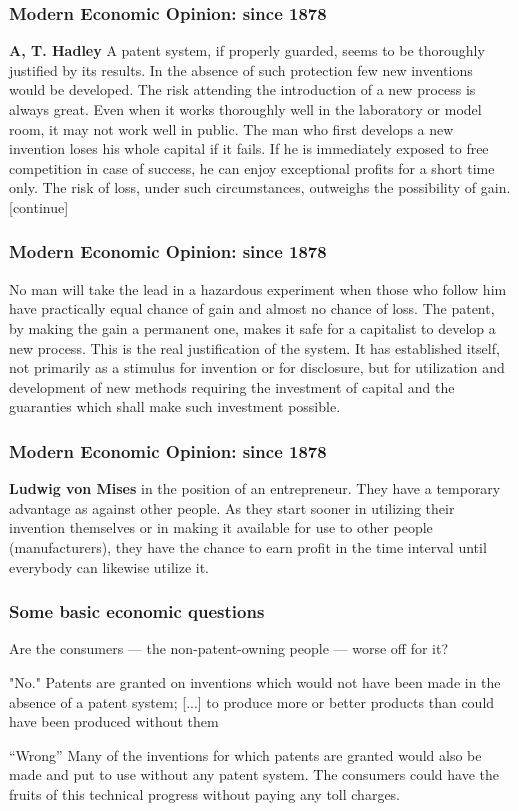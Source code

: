 \begin{frame}
\frametitle{Modern Economic Opinion: since 1878}
\textbf{A, T. Hadley}
A patent system, if properly guarded, seems to be thoroughly justified by its results. In the absence of such protection few new inventions would be developed. The risk attending the introduction of a new process is always great. Even when it works thoroughly well in the laboratory or model room, it may not work well in public. The man who first develops a new invention loses his whole capital if it fails. If he is immediately exposed to free competition in case of success, he can enjoy exceptional profits for a short time only. The risk of loss, under such circumstances, outweighs the possibility of gain. [continue]
\end{frame}

\begin{frame}
\frametitle{Modern Economic Opinion: since 1878}
No man will take the lead in a hazardous experiment when those who follow him have practically equal chance of gain and almost no chance of loss. The patent, by making the gain a permanent one, makes it safe for a capitalist to develop a new process. This is the real justification of the system. It has established itself, not primarily as a stimulus for invention or for disclosure, but for utilization and development of new methods requiring the investment of capital and the guaranties which shall make such investment possible.
\end{frame}

\begin{frame}
\frametitle{Modern Economic Opinion: since 1878}
\textbf{Ludwig von Mises}
in the position of an entrepreneur. They have a temporary advantage as against other people. As they start sooner in utilizing their invention themselves or in making it available for use to other people (manufacturers), they have the chance to earn profit in the time interval until everybody can likewise utilize it.
\end{frame}


\begin{frame}
\frametitle{Some basic economic questions}
Are the consumers — the non-patent-owning people — worse off for it?

"No." Patents are granted on inventions which would not have been made in the absence of a patent system; [...] to produce more or better products than could have been produced without them

“Wrong” Many of the inventions for which patents are granted would also be made and put to use without any patent system. The consumers could have the fruits of this technical progress without paying any toll charges.
\end{frame}


